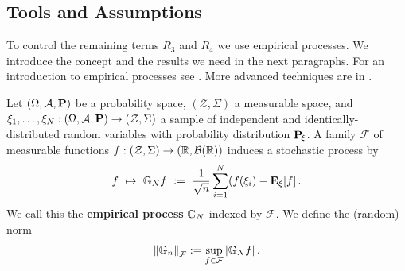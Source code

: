 \subsection{Tools and Assumptions}

To control the remaining terms $R_3$ and $R_4$ we use empirical processes. We introduce the concept and the results we need in the next paragraphs. 
For an introduction to empirical processes see \cite{Vaart2000}. More advanced techniques are in \cite{vaart2013}.

Let 
$
  \left( 
    \Omega,
    \mathcal{A},
    \P
  \right)
$
be a probability space,
$
  \left( 
    \mathcal{Z},
    \Sigma
  \right)
$
a measurable space, and 
$
  \xi_1,\ldots,\xi_N
  :
  \left( 
    \Omega,
    \mathcal{A},
    \P
  \right)
  \to
  \left( 
    \mathcal{Z},
    \Sigma
  \right)
$
a sample 
of independent and identically-distributed
random variables
with probability distribution $\P_{\!\xi}$.
A family $\mathcal{F}$ of measurable functions 
$
  f:
  \left( 
    \mathcal{Z},
    \Sigma
  \right)
    \to
  \left( 
    \R,
    \mathcal{B}(\R)
  \right)
$
induces a stochastic process by
\begin{gather}
  f
  \ 
  \mapsto
  \ 
  \G_N f 
  \ 
  :=
  \ 
  \frac{1}{\sqrt{n}}
  \sum_{i=1}^{N} 
  (
    f(\xi_i)
    -
    \E_\xi[f]
  \,.
\end{gather}
We call this the  \textbf{empirical process} $\G_N$ indexed by $\mathcal{F}$.
We define the (random) norm
\begin{gather}
  \norm{\G_n}_\mathcal{F}
  :=
  \sup_
        { f \in \mathcal{F}}
        \left|
          \G_N f
        \right|
        .
\end{gather}
